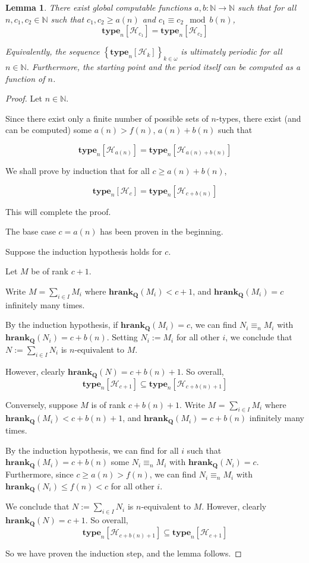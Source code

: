 \documentclass{article}
\newtheorem{lemma}{Lemma}
\newcommand{\brackets}[1]{\left[ {#1} \right]}
\newcommand{\braces}[1]{\left\{ {#1} \right\}}
\newcommand{\hrank}[1]{\mathbf{hrank}_{\qq}\left( #1 \right)}
\newcommand{\qq}{\mathbf{Q}}
\newcommand{\NN}{\mathbb{N}}
\newcommand{\type}[2]{\mathbf{type}_{#1} \brackets{#2}}
\begin{document}
\begin{lemma}
  There exist global computable functions $a, b : \NN \to \NN$ such that
  for all $n, c_1, c_2 \in \NN$ such that $c_1, c_2 \ge a(n)$ and $c_1 \equiv c_2 \mod b(n)$,
  $$\type{n}{\mathcal{H}_{c_1}} = \type{n}{\mathcal{H}_{c_2}}$$

  Equivalently, the sequence $\braces{\type{n}{\mathcal{H}_{k}}}_{k \in \omega}$ 
  is ultimately periodic for all $n \in \NN$. Furthermore, the starting point and the period
  itself can be computed as a function of $n$.
\end{lemma}

\begin{proof}
  Let $n \in \NN$.

  Since there exist only a finite number of possible
  sets of $n$-types, there exist (and can be computed)
  some $a(n) > f(n)$, $a(n) + b(n)$ such that
  
  $$\type{n}{\mathcal{H}_{a(n)}} = \type{n}{\mathcal{H}_{a(n) + b(n)}}$$
  
  We shall prove by induction that for all $c \ge a(n) + b(n)$,

  $$\type{n}{\mathcal{H}_{c}} = \type{n}{\mathcal{H}_{c + b(n)}}$$

  This will complete the proof.

  The base case $c = a(n)$ has been proven in the beginning.

  Suppose the induction hypothesis holds for $c$.

  Let $M$ be of rank $c + 1$.

  Write $M = \sum_{i \in I} M_i$ where $\hrank{M_i} < c + 1$,
  and $\hrank{M_i} = c$ infinitely many times.

  By the induction hypothesis,
  if $\hrank{M_i} = c$, we can find $N_i \equiv_n M_i$ with $\hrank{N_i} = c + b(n)$.
  Setting $N_i := M_i$ for all other $i$, we conclude that $N := \sum_{i \in I} N_i$
  is $n$-equivalent to $M$.

  However, clearly $\hrank{N} = c + b(n) + 1$. So overall,
  $$\type{n}{\mathcal{H}_{c + 1}} \subseteq \type{n}{\mathcal{H}_{c + b(n) + 1}}$$

  Conversely, suppose $M$ is of rank $c + b(n) + 1$.
  Write $M$ = $\sum_{i \in I} M_i$ where $\hrank{M_i} < c + b(n) + 1$,
  and $\hrank{M_i} = c + b(n)$ infinitely many times.

  By the induction hypothesis,
  we can find for all $i$ such that $\hrank{M_i} = c + b(n)$ some 
  $N_i \equiv_n M_i$ with $\hrank{N_i} = c$.
  Furthermore, since $c \ge a(n) > f(n)$, we can
  find $N_i \equiv_n M_i$ with $\hrank{N_i} \le f(n) < c$ for all other $i$.

  We conclude that $N := \sum_{i \in I} N_i$ is $n$-equivalent to $M$.
  However, clearly $\hrank{N} = c + 1$. So overall,
  $$\type{n}{\mathcal{H}_{c + b(n) + 1}} \subseteq \type{n}{\mathcal{H}_{c + 1}}$$

  So we have proven the induction step, and the lemma follows.
\end{proof}
\end{document}
